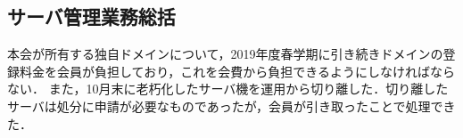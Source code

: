 \subsection*{サーバ管理業務総括}

本会が所有する独自ドメインについて，2019年度春学期に引き続きドメインの登録料金を会員が負担しており，これを会費から負担できるようにしなければならない．
また，10月末に老朽化したサーバ機を運用から切り離した．切り離したサーバは処分に申請が必要なものであったが，会員が引き取ったことで処理できた．

